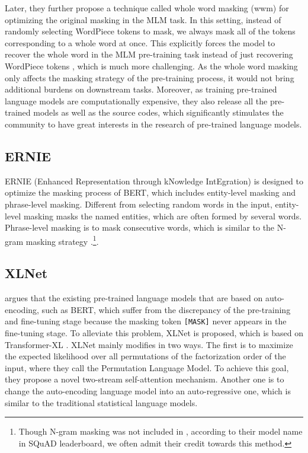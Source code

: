 \documentclass[journal]{IEEEtran}
\begin{document}
\begin{CJK*}{UTF8}{gbsn}
Later, they further propose a technique called whole word masking (wwm) for optimizing the original masking in the MLM task.
In this setting, instead of randomly selecting WordPiece \cite{wu2016google} tokens to mask, we always mask all of the tokens corresponding to a whole word at once. 
This explicitly forces the model to recover the whole word in the MLM pre-training task instead of just recovering WordPiece tokens \cite{chinese-bert-wwm}, which is much more challenging.
As the whole word masking only affects the masking strategy of the pre-training process, it would not bring additional burdens on downstream tasks.
Moreover, as training pre-trained language models are computationally expensive, they also release all the pre-trained models as well as the source codes, which significantly stimulates the community to have great interests in the research of pre-trained language models.

\subsection{ERNIE}
ERNIE (Enhanced Representation through kNowledge IntEgration) \cite{sun2019ernie} is designed to optimize the masking process of BERT, which includes entity-level masking and phrase-level masking. 
Different from selecting random words in the input, entity-level masking masks the named entities, which are often formed by several words.
Phrase-level masking is to mask consecutive words, which is similar to the N-gram masking strategy \cite{devlin-etal-2019-bert,joshi2019spanbert,Kong2020A}.\footnote{Though N-gram masking was not included in \cite{devlin-etal-2019-bert}, according to their model name in  SQuAD leaderboard, we often admit their credit towards this method.}. 


\subsection{XLNet}
\cite{yang2019xlnet} argues that the existing pre-trained language models that are based on auto-encoding, such as BERT, which suffer from the discrepancy of the pre-training and fine-tuning stage because the masking token {\tt [MASK]} never appears in the fine-tuning stage.
To alleviate this problem, XLNet is proposed, which is based on Transformer-XL \cite{dai-etal-2019-transformer}. 
XLNet mainly modifies in two ways. 
The first is to maximize the expected likelihood over all permutations of the factorization order of the input, where they call the Permutation Language Model. 
To achieve this goal, they propose a novel two-stream self-attention mechanism.
Another one is to change the auto-encoding language model into an auto-regressive one, which is similar to the traditional statistical language models.



\end{CJK*}
\end{document}
